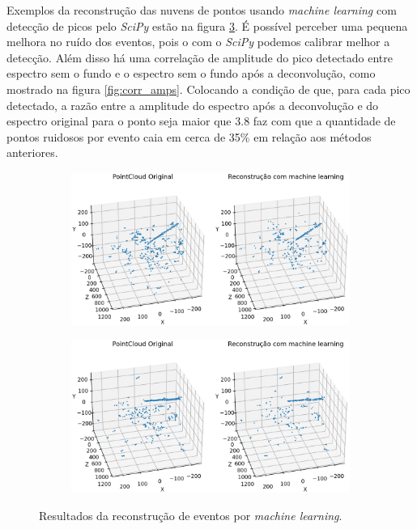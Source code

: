 \documentclass[a4paper,12pt,oneside]{book}
\begin{document}
\par Exemplos da reconstrução das nuvens de pontos usando \textit{machine learning} com detecção de picos pelo \textit{SciPy} estão na figura \ref{fig:ml_pc_exs}. É possível perceber uma pequena melhora no ruído dos eventos, pois o com o \textit{SciPy} podemos calibrar melhor a detecção. Além disso há uma correlação de amplitude do pico detectado entre espectro sem o fundo e o espectro sem o fundo após a deconvolução, como mostrado na figura \ref{fig:corr_amps}. Colocando a condição de que, para cada pico detectado, a razão entre a amplitude do espectro após a deconvolução e do espectro original para o ponto seja maior que 3.8 faz com que a quantidade de pontos ruidosos por evento caia em cerca de 35\% em relação aos métodos anteriores.

\begin{figure}[H]
\centering
    \begin{subfigure}[b]{\textwidth}
        \centering
        \includegraphics[scale=0.4]{figs/ml_pc_ex1.png}
        \caption{}
        \label{subfig:ml_pc_ex1}
    \end{subfigure}%
    \vspace{0.2cm}
    \begin{subfigure}[b]{\textwidth}
        \centering
        \includegraphics[scale=0.4]{figs/ml_pc_ex2.png}
        \caption{}
        \label{subfig:ml_pc_ex2}
    \end{subfigure}
\caption{Resultados da reconstrução de eventos por \textit{machine learning}.}
\label{fig:ml_pc_exs}
\end{figure}
\end{document}
